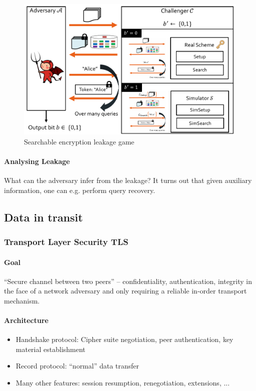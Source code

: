 \begin{figure}[h]
    \centering
	\includegraphics[scale=0.4]{images/searchable-encryption-leakage.png}
    \caption{Searchable encryption leakage game}
    \label{fig:searchable-encryption-leakage}
\end{figure}

\paragraph{Analysing Leakage}
What can the adversary infer from the leakage?
It turns out that given auxiliary information, one can e.g. perform query recovery.


\subsection{Data in transit}

\subsubsection{Transport Layer Security TLS}

\paragraph{Goal} ``Secure channel between two peers'' --
confidentiality, authentication, integrity in the face of a network adversary
and only requiring a reliable in-order transport mechanism.

\paragraph{Architecture}
\begin{itemize}
\item Handshake protocol:
Cipher suite negotiation, peer authentication, key material establishment
\item Record protocol:
``normal'' data transfer
\item Many other features: session resumption, renegotiation, extensions, ...
\end{itemize}

